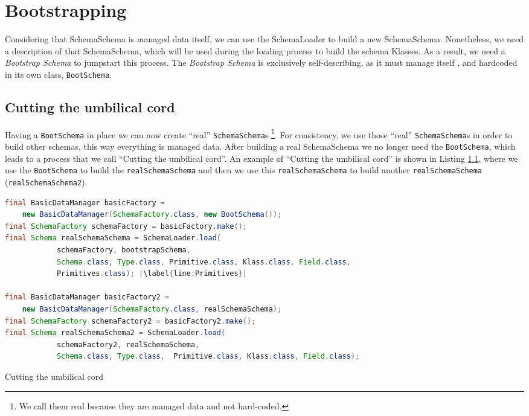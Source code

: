 \section{Bootstrapping}\label{sec:Bootstrapping}
Considering that SchemaSchema is managed data itself, we can use the SchemaLoader to build a new SchemaSchema.
Nonetheless, we need a description of that SchemaSchema, which will be used during the loading process to build the schema Klasses.
As a result, we need a \textit{Bootstrap Schema} to jumpstart this process.
The \textit{Bootstrap Schema} is exclusively self-describing, as it must manage itself \cite{loh2012managed}, and hardcoded in its own class, \texttt{BootSchema}.

\subsection{Cutting the umbilical cord}\label{subsec:Cutting the umbilical cord}
Having a \texttt{BootSchema} in place we can now create ``real'' \texttt{SchemaSchema}s \footnote{
	We call them real because they are managed data and not hard-coded.}.
For consistency, we use those ``real'' \texttt{SchemaSchema}s in order to build other schemas, this way everything is managed data.
After building a real SchemaSchema we no longer need the \texttt{BootSchema}, which leads to a process that we call ``Cutting the umbilical cord''.
An example of ``Cutting the umbilical cord'' is shown in Listing \ref{subsec:Cutting the umbilical cord}, where we use the \texttt{BootSchema} to build the \texttt{realSchemaSchema} and then we use this \texttt{realSchemaSchema} to build another \texttt{realSchemaSchema} (\texttt{realSchemaSchema2}).

\begin{sourcecode} [H]
	\begin{lstlisting}[language=Java, escapechar=|]
final BasicDataManager basicFactory = 
	new BasicDataManager(SchemaFactory.class, new BootSchema());
final SchemaFactory schemaFactory = basicFactory.make();
final Schema realSchemaSchema = SchemaLoader.load(
        	schemaFactory, bootstrapSchema, 
         	Schema.class, Type.class, Primitive.class, Klass.class, Field.class,
        	Primitives.class); |\label{line:Primitives}|

final BasicDataManager basicFactory2 = 
	new BasicDataManager(SchemaFactory.class, realSchemaSchema);
final SchemaFactory schemaFactory2 = basicFactory2.make();
final Schema realSchemaSchema2 = SchemaLoader.load(
        	schemaFactory2, realSchemaSchema, 
        	Schema.class, Type.class,  Primitive.class, Klass.class, Field.class);
	\end{lstlisting}
	\caption{Cutting the umbilical cord}
	\label{lst:Cutting the umbilical cord}
\end{sourcecode}

